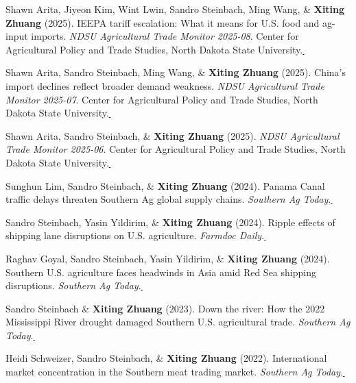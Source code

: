 \documentclass[10.8 pt,letterpaper]{article}
\newcommand{\paperlink}[1]{\href{#1}{\,\small\faExternalLink}}
\renewenvironment{itemize}{
	\begin{list}{}{
			\setlength{\leftmargin}{1.5em}
		}
	}{
	\end{list}
}
\begin{document}
\begin{itemize}
		\item[-] Shawn Arita, Jiyeon Kim, Wint Lwin, Sandro Steinbach, Ming Wang, \& \textbf{Xiting Zhuang} (2025). IEEPA tariff escalation: What it means for U.S. food and ag-input imports. \textit{NDSU Agricultural Trade Monitor 2025-08}. Center for Agricultural Policy and Trade Studies, North Dakota State University.\paperlink{https://www.capts-ndsu.com/_files/ugd/3c6228_44202bdfcc8f4c01af0995141c8215fe.pdf}
		
		\item[-] Shawn Arita, Sandro Steinbach, Ming Wang, \& \textbf{Xiting Zhuang} (2025). China's import declines reflect broader demand weakness. \textit{NDSU Agricultural Trade Monitor 2025-07}. Center for Agricultural Policy and Trade Studies, North Dakota State University.\paperlink{https://www.capts-ndsu.com/_files/ugd/3c6228_d4656ab5a23e4cb2a2d9572e4817be85.pdf}
		
		\item[-] Shawn Arita, Sandro Steinbach, \& \textbf{Xiting Zhuang} (2025). \textit{NDSU Agricultural Trade Monitor 2025-06}. Center for Agricultural Policy and Trade Studies, North Dakota State University.\paperlink{https://www.capts-ndsu.com/_files/ugd/3c6228_275669f200b147d6993ae2fef14c7edc.pdf}
		
		\item[-] Sunghun Lim, Sandro Steinbach, \& \textbf{Xiting Zhuang} (2024). Panama Canal traffic delays threaten Southern Ag global supply chains. \textit{Southern Ag Today}.\paperlink{https://southernagtoday.org/2024/01/18/panama-canal-traffic-delays-threaten-southern-ag-global-supply-chains/}
		
		\item[-] Sandro Steinbach, Yasin Yildirim, \& \textbf{Xiting Zhuang} (2024). Ripple effects of shipping lane disruptions on U.S. agriculture. \textit{Farmdoc Daily}.\paperlink{https://farmdocdaily.illinois.edu/2024/01/ripple-effects-of-shipping-lane-disruptions-on-u-s-agriculture.html}
		
		\item[-] Raghav Goyal, Sandro Steinbach, Yasin Yildirim, \& \textbf{Xiting Zhuang} (2024). Southern U.S. agriculture faces headwinds in Asia amid Red Sea shipping disruptions. \textit{Southern Ag Today}.\paperlink{https://southernagtoday.org/2024/02/01/southern-u-s-agriculture-faces-headwinds-in-asia-amid-red-sea-shipping-disruptions/}
		
		\item[-] Sandro Steinbach \& \textbf{Xiting Zhuang} (2023). Down the river: How the 2022 Mississippi River drought damaged Southern U.S. agricultural trade. \textit{Southern Ag Today}.\paperlink{https://southernagtoday.org/2023/05/04/down-the-river-how-the-2022-mississippi-river-drought-damaged/}
		\item[-] Heidi Schweizer, Sandro Steinbach, \& \textbf{Xiting Zhuang} (2022). International market concentration in the Southern meat trading market. \textit{Southern Ag Today}.\paperlink{https://southernagtoday.org/2022/07/14/international-market-concentration-in-the-southern-meat-trading-market/}
		

\end{itemize}
\end{document}
